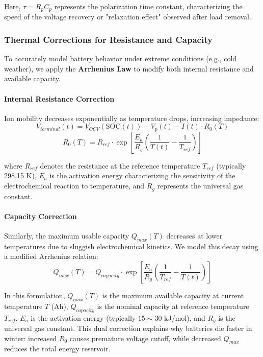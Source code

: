 \documentclass{mcmthesis}
\newcommand{\SOC}{\text{SOC}}
\newcommand{\Vterm}{V_{terminal}}
\newcommand{\Vocv}{V_{OCV}}
\newcommand{\Vp}{V_{p}}
\newcommand{\Qcap}{Q_{capacity}}
\newcommand{\Qmax}{Q_{max}}
\newcommand{\Tref}{T_{ref}}
\begin{document}
Here, $\tau = R_p C_p$ represents the polarization time constant, characterizing the speed of the voltage recovery or "relaxation effect" observed after load removal.

\subsubsection{Thermal Corrections for Resistance and Capacity}
To accurately model battery behavior under extreme conditions (e.g., cold weather), we apply the \textbf{Arrhenius Law} to modify both internal resistance and available capacity.

\paragraph{Internal Resistance Correction}
Ion mobility decreases exponentially as temperature drops, increasing impedance:
\begin{equation} \label{eq:output}
\Vterm(t) = \Vocv(\SOC(t)) - \Vp(t) - I(t) \cdot R_0(T)
\end{equation}
\begin{equation} \label{eq:arrhenius_R}
R_0(T) = R_{ref} \cdot \exp\left[ \frac{E_a}{R_g} \left( \frac{1}{T(t)} - \frac{1}{\Tref} \right) \right]
\end{equation}

where $R_{ref}$ denotes the resistance at the reference temperature $\Tref$ (typically 298.15 K), $E_a$ is the activation energy characterizing the sensitivity of the electrochemical reaction to temperature, and $R_g$ represents the universal gas constant.

\paragraph{Capacity Correction}
Similarly, the maximum usable capacity $\Qmax(T)$ decreases at lower temperatures due to sluggish electrochemical kinetics. We model this decay using a modified Arrhenius relation:
\begin{equation} \label{eq:arrhenius_C}
\Qmax(T) = \Qcap \cdot \exp\left[ \frac{E_a}{R_g} \left( \frac{1}{\Tref} - \frac{1}{T(t)} \right) \right]
\end{equation}

In this formulation, $\Qmax(T)$ is the maximum available capacity at current temperature $T$ (Ah), $\Qcap$ is the nominal capacity at reference temperature $\Tref$, $E_a$ is the activation energy (typically $15 \sim 30$ kJ/mol), and $R_g$ is the universal gas constant. This dual correction explains why batteries die faster in winter: increased $R_0$ causes premature voltage cutoff, while decreased $\Qmax$ reduces the total energy reservoir.
\end{document}
